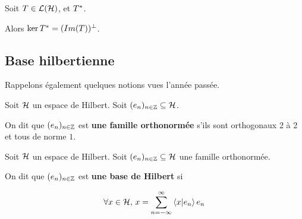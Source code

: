 \begin{exercice}
	\label{ex:ker_image_ortho_adjointe}
	Soit $T \in \mathcal{L}(\mathcal{H})$, et $T^{*}$.

	Alors $\ker{T^{*}} = (Im(T))^{\perp}$.
\end{exercice}

\subsection{Base hilbertienne}

Rappelons également quelques notions vues l'année passée.

\begin{definition}
	Soit $\mathcal{H}$ un espace de Hilbert.
	Soit $(e_{n})_{n \in \mathbb{Z}} \subseteq \mathcal{H}$.

	On dit que $(e_{n})_{n \in \mathbb{Z}}$ est \textbf{une famille
	orthonormée} s'ils sont orthogonaux 2 à 2 et tous de norme $1$.
\end{definition}

\begin{definition}
	Soit $\mathcal{H}$ un espace de Hilbert.
	Soit $(e_{n})_{n \in \mathbb{Z}} \subseteq \mathcal{H}$ une famille
	orthonormée.

	On dit que $(e_{n})_{n \in \mathbb{Z}}$ est \textbf{une base de Hilbert} si

	\begin{equation}
	\forall x \in \mathcal{H}, \, x = \displaystyle \sum_{n = -\infty}^{\infty}
	\bra{x}\ket{e_{n}} e_{n}
	\end{equation}
\end{definition}


